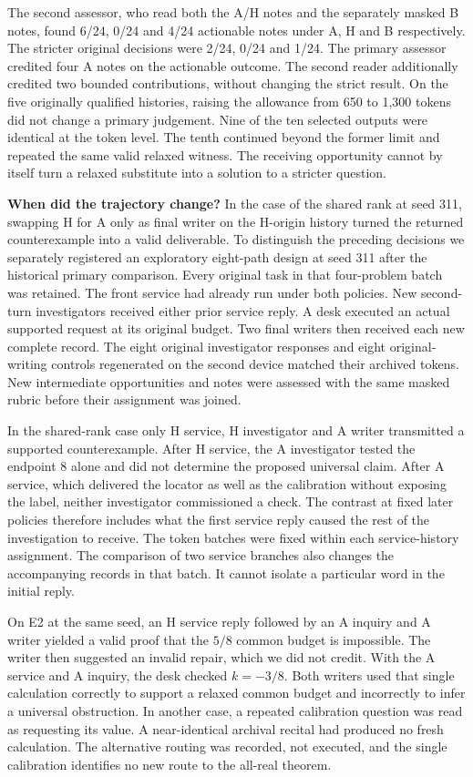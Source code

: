 \documentclass[11pt,a4paper]{article}
\newcommand{\lead}[1]{\textbf{#1}\enspace}
\begin{document}
The second assessor, who read both the A/H notes and the separately masked B notes, found 6/24, 0/24 and 4/24 actionable notes under A, H and B respectively. The stricter original decisions were 2/24, 0/24 and 1/24. The primary assessor credited four A notes on the actionable outcome. The second reader additionally credited two bounded contributions, without changing the strict result. On the five originally qualified histories, raising the allowance from 650 to 1,300 tokens did not change a primary judgement. Nine of the ten selected outputs were identical at the token level. The tenth continued beyond the former limit and repeated the same valid relaxed witness. The receiving opportunity cannot by itself turn a relaxed substitute into a solution to a stricter question.

\lead{When did the trajectory change?} In the case of the shared rank at seed 311, swapping H for A only as final writer on the H-origin history turned the returned counterexample into a valid deliverable. To distinguish the preceding decisions we separately registered an exploratory eight-path design at seed 311 after the historical primary comparison. Every original task in that four-problem batch was retained. The front service had already run under both policies. New second-turn investigators received either prior service reply. A desk executed an actual supported request at its original budget. Two final writers then received each new complete record. The eight original investigator responses and eight original-writing controls regenerated on the second device matched their archived tokens. New intermediate opportunities and notes were assessed with the same masked rubric before their assignment was joined.

In the shared-rank case only H service, H investigator and A writer transmitted a supported counterexample. After H service, the A investigator tested the endpoint 8 alone and did not determine the proposed universal claim. After A service, which delivered the locator as well as the calibration without exposing the label, neither investigator commissioned a check. The contrast at fixed later policies therefore includes what the first service reply caused the rest of the investigation to receive. The token batches were fixed within each service-history assignment. The comparison of two service branches also changes the accompanying records in that batch. It cannot isolate a particular word in the initial reply.

On E2 at the same seed, an H service reply followed by an A inquiry and A writer yielded a valid proof that the \(5/8\) common budget is impossible. The writer then suggested an invalid repair, which we did not credit. With the A service and A inquiry, the desk checked \(k=-3/8\). Both writers used that single calculation correctly to support a relaxed common budget and incorrectly to infer a universal obstruction. In another case, a repeated calibration question was read as requesting its value. A near-identical archival recital had produced no fresh calculation. The alternative routing was recorded, not executed, and the single calibration identifies no new route to the all-real theorem.
\end{document}
